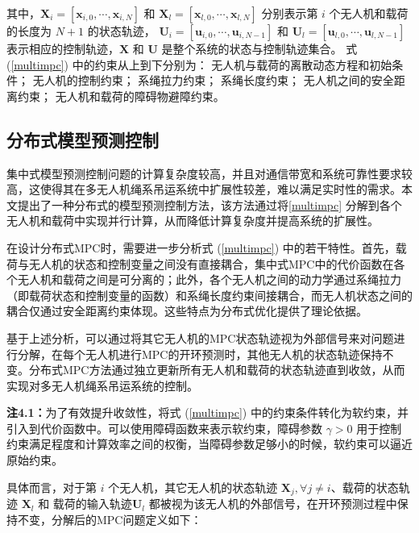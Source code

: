 \documentclass[lang=chs, degree=master, blindreview=false, winfonts=true]{yanputhesis}
\begin{document}
其中，\( \bm X_i = \left[ \bm x_{i,0}, \cdots, \bm x_{i,N} \right] \) 和 \( \bm X_l = \left[ \bm x_{l,0}, \cdots, \bm x_{l,N} \right] \) 分别表示第 \( i \) 个无人机和载荷的长度为 \( N+1 \) 的状态轨迹，
\( \bm U_i = \left[ \bm u_{i,0}, \cdots, \bm u_{i,{N-1}} \right] \) 和 \( \bm U_l = \left[ \bm u_{l,0}, \cdots, \bm u_{l,{N-1}} \right] \) 表示相应的控制轨迹，\( \bm X \) 和 \( \bm U \) 是整个系统的状态与控制轨迹集合。
式 (\ref{multimpc}) 中的约束从上到下分别为：
无人机与载荷的离散动态方程和初始条件；
无人机的控制约束；
系绳拉力约束；
系绳长度约束；
无人机之间的安全距离约束；
无人机和载荷的障碍物避障约束。

\subsection{分布式模型预测控制}
集中式模型预测控制问题的计算复杂度较高，并且对通信带宽和系统可靠性要求较高，这使得其在多无人机绳系吊运系统中扩展性较差，难以满足实时性的需求。本文提出了一种分布式的模型预测控制方法，该方法通过将\autoref{multimpc} 分解到各个无人机和载荷中实现并行计算，从而降低计算复杂度并提高系统的扩展性。

在设计分布式MPC时，需要进一步分析式 (\ref{multimpc}) 中的若干特性。首先，载荷与无人机的状态和控制变量之间没有直接耦合，集中式MPC中的代价函数在各个无人机和载荷之间是可分离的；此外，各个无人机之间的动力学通过系绳拉力（即载荷状态和控制变量的函数）和系绳长度约束间接耦合，而无人机状态之间的耦合仅通过安全距离约束体现。这些特点为分布式优化提供了理论依据。

基于上述分析，可以通过将其它无人机的MPC状态轨迹视为外部信号来对问题进行分解，在每个无人机进行MPC的开环预测时，其他无人机的状态轨迹保持不变。分布式MPC方法通过独立更新所有无人机和载荷的状态轨迹直到收敛，从而实现对多无人机绳系吊运系统的控制。

\textbf{注4.1：}为了有效提升收敛性，将式 (\ref{multimpc}) 中的约束条件转化为软约束，并引入到代价函数中。可以使用障碍函数来表示软约束，障碍参数 $\gamma > 0$ 用于控制约束满足程度和计算效率之间的权衡，当障碍参数足够小的时候，软约束可以逼近原始约束。


具体而言，对于第 $i$ 个无人机，其它无人机的状态轨迹 $ \bm X_j, \forall j \neq i$、载荷的状态轨迹 $\bm X_l$ 和 载荷的输入轨迹$\bm U_l$ 都被视为该无人机的外部信号，在开环预测过程中保持不变，分解后的MPC问题定义如下：
\end{document}
